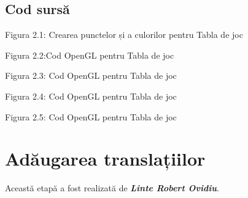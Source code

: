 \documentclass[12pt]{report}
\begin{document}
    \section{Cod sursă}
    
    \begin{center}
        Figura 2.1: Crearea punctelor și a culorilor pentru Tabla de joc
    \end{center}
    
    \newpage
    

    \begin{center}
        Figura 2.2:Cod OpenGL pentru Tabla de joc
    \end{center}

    

    \begin{center}
        Figura 2.3: Cod OpenGL pentru Tabla de joc
    \end{center}

    

    \begin{center}
        Figura 2.4: Cod OpenGL pentru Tabla de joc
    \end{center}

    

    \begin{center}
        Figura 2.5: Cod OpenGL pentru Tabla de joc
    \end{center}

    \newpage
    \chapter{Adăugarea translațiilor}
    Această etapă a fost realizată de \emph{\textbf{Linte Robert Ovidiu}}.
\end{document}
